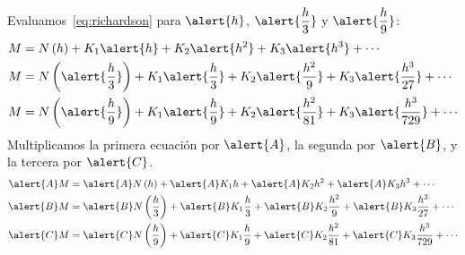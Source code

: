 \begin{frame}
    \begin{solution}
        Evaluamos~\eqref{eq:richardson} para $\alert{h}$,
        $\alert{\dfrac{h}{3}}$ y $\alert{\dfrac{h}{9}}$:
        \begin{align*}
            M & =
            N\left(h\right)+
            K_{1}\alert{h}+
            K_{2}\alert{h^{2}}+
            K_{3}\alert{h^{3}}+
            \cdots
            \\
            M & =
            N\left(\alert{\dfrac{h}{3}}\right)+
            K_{1}\alert{\dfrac{h}{3}}+
            K_{2}\alert{\dfrac{h^{2}}{9}}+
            K_{3}\alert{\dfrac{h^{3}}{27}}+
            \cdots \\
            M & =
            N\left(\alert{\dfrac{h}{9}}\right)+
            K_{1}\alert{\dfrac{h}{9}}+
            K_{2}\alert{\dfrac{h^{2}}{81}}+
            K_{3}\alert{\dfrac{h^{3}}{729}}+
            \cdots
        \end{align*}
        Multiplicamos la primera ecuación por $\alert{A}$, la segunda
        por $\alert{B}$, y la tercera por $\alert{C}$.
        \begin{align*}
            \alert{A}M & =
            \alert{A}N\left(h\right)+
            \alert{A}K_{1}h+
            \alert{A}K_{2}h^{2}+
            \alert{A}K_{3}h^{3}+
            \cdots
            \\
            \alert{B}M & =
            \alert{B}N\left(\dfrac{h}{3}\right)+
            \alert{B}K_{1}\dfrac{h}{3}+
            \alert{B}K_{2}\dfrac{h^{2}}{9}+
            \alert{B}K_{3}\dfrac{h^{3}}{27}+
            \cdots         \\
            \alert{C}M & =
            \alert{C}N\left(\dfrac{h}{9}\right)+
            \alert{C}K_{1}\dfrac{h}{9}+
            \alert{C}K_{2}\dfrac{h^{2}}{81}+
            \alert{C}K_{3}\dfrac{h^{3}}{729}+
            \cdots
        \end{align*}
    \end{solution}
\end{frame}

